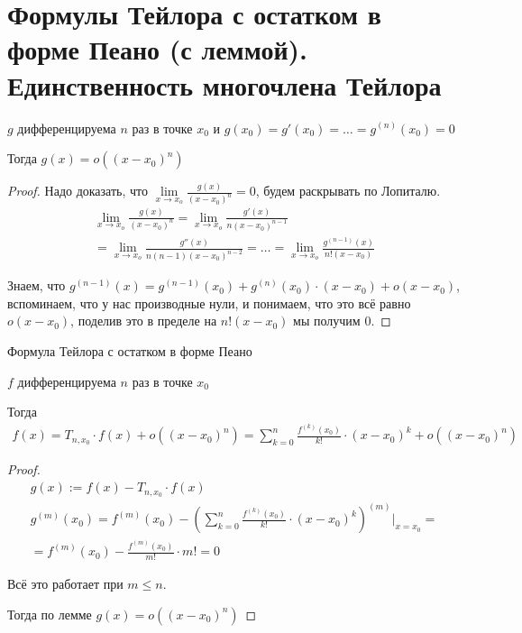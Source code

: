 \section{Формулы Тейлора с остатком в форме Пеано (с леммой). Единственность многочлена Тейлора}

\begin{lemma}
    
    $g$ дифференцируема $n$ раз в точке $x_0$ и $g(x_0) = g'(x_0) = \dots = g^{(n)}(x_0) = 0$

    Тогда $g(x) = o((x - x_0)^n)$

    \begin{proof}
        
        Надо доказать, что $\lim\limits_{x \to x_o} \frac{g(x)}{(x-x_0)^n} = 0$,
        будем раскрывать по Лопиталю.
        \begin{gather*}
            \lim\limits_{x \to x_o} \frac{g(x)}{(x-x_0)^n} = \lim\limits_{x \to x_o} \frac{g'(x)}{n(x-x_0)^{n-1}} \\ 
            = \lim\limits_{x \to x_o} \frac{g''(x)}{n(n-1)(x-x_0)^{n-2}} = \dots = \lim\limits_{x \to x_o} \frac{g^{(n-1)}(x)}{n!(x-x_0)}
        \end{gather*}

        Знаем, что $g^{(n-1)}(x) = g^{(n-1)}(x_0) + g^{(n)}(x_0) \cdot (x - x_0) + o(x - x_0)$, вспоминаем,
        что у нас производные нули, и понимаем, что это всё равно $o(x - x_0)$, поделив это в пределе на $n!(x-x_0)$ мы получим $0$.

    \end{proof}

\end{lemma}


\begin{theorem-non}
    Формула Тейлора с остатком в форме Пеано

    $f$ дифференцируема $n$ раз в точке $x_0$

    Тогда 
    \begin{gather*}
        f(x) = T_{n, x_0} \cdot f(x) + o((x - x_0)^n) = \sum_{k=0}^{n} \frac{f^{(k)}(x_0)}{k!} \cdot (x - x_0)^k + o((x - x_0)^n)
    \end{gather*}

    \begin{proof}

            \begin{gather*}
                g(x) := f(x) - T_{n, x_0} \cdot f(x) \\
                g^{(m)}(x_0) = f^{(m)}(x_0) - (\sum_{k = 0}^{n} \frac{f^{(k)}(x_0)}{k!} \cdot (x - x_0)^k)^{(m)} |_{x = x_0} = \\
                = f^{(m)}(x_0) - \frac{f^{(m)}(x_0)}{m!} \cdot m! = 0
            \end{gather*}

            Всё это работает при $m \leqslant n$.

            Тогда по лемме $g(x) = o((x - x_0)^n)$
    \end{proof}
\end{theorem-non}

